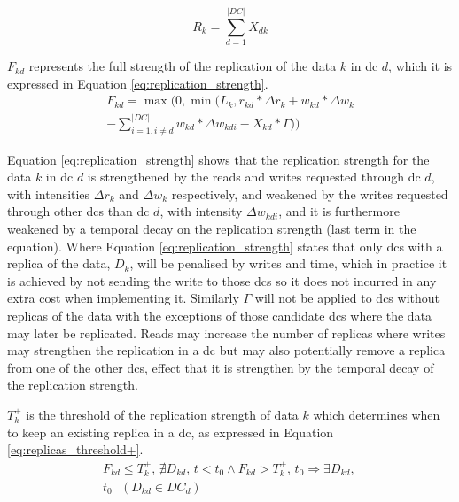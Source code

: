 \documentclass{acm_proc_article-sp}
\begin{document}
\begin{equation} \label{eq:num_replicas}
R_{k} = \sum^{|DC|}_{d = 1} X_{dk}
\end{equation}

$F_{kd}$ represents the full strength of the replication of the data $k$ in \gls{dc} $d$, which it is expressed in Equation \ref{eq:replication_strength}.
\begin{equation}  \label{eq:replication_strength}
	\begin{split}
		 F_{kd} = \max(0, \min(L_{k}, r_{kd} * \Delta r_{k} + w_{kd} * \Delta w_{k}\\
		 - \sum^{|DC|}_{i = 1, i \neq d} w_{kd} * \Delta w_{kdi} - X_{kd} * \Gamma))
	 \end{split}
\end{equation}


Equation \ref{eq:replication_strength} shows that the replication strength for the data $k$ in \gls{dc} $d$ is strengthened by the reads and writes requested through \gls{dc} $d$, with intensities $\Delta r_{k}$ and $\Delta w_{k}$ respectively, and weakened  by the writes requested through other \glspl{dc} than \gls{dc} $d$, with intensity $\Delta w_{kdi}$, and it is furthermore weakened by a temporal decay on the replication strength (last term in the equation). Where Equation \ref{eq:replication_strength} states that only \glspl{dc} with a replica of the data, $D_{k}$, will be penalised by writes and time, which in practice it is achieved by not sending the write to those \glspl{dc} so it does not incurred in any extra cost when implementing it. Similarly $\Gamma$ will not be applied to \glspl{dc} without replicas of the data with the exceptions of those candidate \glspl{dc} where the data may later be replicated. Reads may increase the number of replicas where writes may strengthen the replication in a \gls{dc} but may also potentially remove a replica from one of the other \glspl{dc}, effect that it is strengthen by the temporal decay of the replication strength.

$T^{+}_{k}$ is the threshold of the replication strength of data $k$ which determines when to keep an existing replica in a \gls{dc}, as expressed in Equation \ref{eq:replicas_threshold+}.
\begin{equation} \label{eq:replicas_threshold+}
	\begin{split}
		F_{kd} \le T^{+}_{k} \text{, } \nexists D_{kd} \text{, } t < t_{0}  \wedge F_{kd} > T^{+}_{k} \text{, } t_{0} \Longrightarrow \exists D_{kd} \text{, }\\
		 t_{0} \text{ } (D_{kd} \in DC_{d})
	\end{split}
\end{equation}
\end{document}
